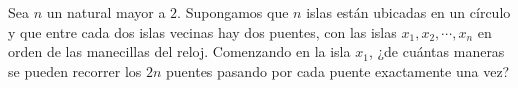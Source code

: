Sea $n$ un natural mayor a $2$. Supongamos que $n$ islas están ubicadas en un círculo y que entre cada dos islas vecinas hay dos puentes, con las islas $x_1, x_2, \cdots , x_n$ en orden de las manecillas del reloj. \newline 
Comenzando en la isla $x_1$, ¿de cuántas maneras se pueden recorrer los $2n$ puentes pasando por cada puente exactamente una vez?
